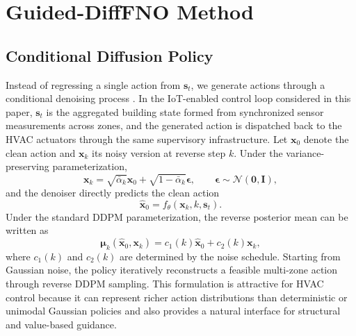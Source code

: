 \documentclass[conference]{IEEEtran}
\theoremstyle{nonumberplain}
\theoremstyle{plain}
\begin{document}
\section{Guided-DiffFNO Method}
\label{sec:method}

\subsection{Conditional Diffusion Policy}

Instead of regressing a single action from $\mathbf{s}_t$, we generate actions through a conditional denoising process \cite{ho2020denoising}. In the IoT-enabled control loop considered in this paper, $\mathbf{s}_t$ is the aggregated building state formed from synchronized sensor measurements across zones, and the generated action is dispatched back to the HVAC actuators through the same supervisory infrastructure. Let $\mathbf{x}_0$ denote the clean action and $\mathbf{x}_k$ its noisy version at reverse step $k$. Under the variance-preserving parameterization,
\begin{equation}
    \mathbf{x}_k =
    \sqrt{\bar{\alpha}_k}\mathbf{x}_0 +
    \sqrt{1-\bar{\alpha}_k}\boldsymbol{\epsilon},
    \qquad
    \boldsymbol{\epsilon}\sim\mathcal{N}(\mathbf{0},\mathbf{I}),
    \label{eq:noisy_action}
\end{equation}
and the denoiser directly predicts the clean action
\begin{equation}
    \hat{\mathbf{x}}_0 = f_{\theta}(\mathbf{x}_k, k, \mathbf{s}_t).
    \label{eq:x0_prediction}
\end{equation}
Under the standard DDPM parameterization, the reverse posterior mean can be written as
\begin{equation}
    \boldsymbol{\mu}_k(\hat{\mathbf{x}}_0,\mathbf{x}_k)=
    c_1(k)\hat{\mathbf{x}}_0 + c_2(k)\mathbf{x}_k,
    \label{eq:posterior_mean}
\end{equation}
where $c_1(k)$ and $c_2(k)$ are determined by the noise schedule. Starting from Gaussian noise, the policy iteratively reconstructs a feasible multi-zone action through reverse DDPM sampling. This formulation is attractive for HVAC control because it can represent richer action distributions than deterministic or unimodal Gaussian policies and also provides a natural interface for structural and value-based guidance.
\end{document}
